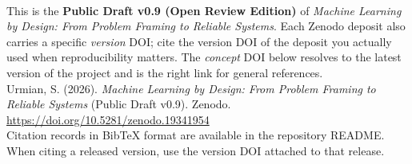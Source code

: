 \thispagestyle{empty}
\vspace*{1.5em}
\\[8pt]

\noindent\small
This is the \textbf{Public Draft v0.9 (Open Review Edition)} of \emph{Machine Learning by Design: From Problem Framing to Reliable Systems}. Each Zenodo deposit also carries a specific \emph{version} DOI; cite the version DOI of the deposit you actually used when reproducibility matters. The \emph{concept} DOI below resolves to the latest version of the project and is the right link for general references.\\[6pt]

\noindent Urmian, S. (2026). \emph{Machine Learning by Design: From Problem Framing to Reliable Systems} (Public Draft v0.9). Zenodo. \url{https://doi.org/10.5281/zenodo.19341954}\\[10pt]

\noindent Citation records in BibTeX format are available in the repository README. When citing a released version, use the version DOI attached to that release.

\clearpage
